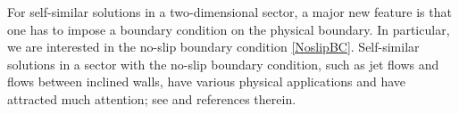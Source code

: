\documentclass[reqno,12pt]{amsart}
\newcommand{\Bu}{{\boldsymbol{u}}}
\begin{document}


For self-similar solutions in a two-dimensional sector, a major new feature is that one has to impose a boundary condition on the physical boundary. In particular, we are interested in the no-slip boundary condition \eqref{NoslipBC}. 
Self-similar solutions in a sector with the no-slip boundary condition, such as jet flows and flows between inclined walls, have various physical applications and have attracted much attention; see \cite{Gusarov20, BanksDrazinZaturska88} and references therein.
\end{document}
